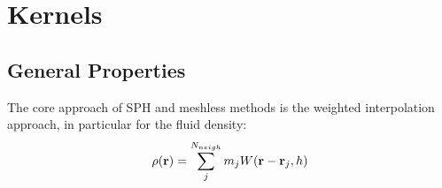 \newpage
\section{Kernels}\label{chap:kernels}


\subsection{General Properties}





The core approach of SPH and meshless methods is the weighted interpolation approach, in particular for the fluid density:
\begin{equation}
	\rho(\R) = \sum_{j}^{N_{neigh}} m_j W(\R - \R_j, h) \label{eq:kernel-sph-density}
\end{equation}

